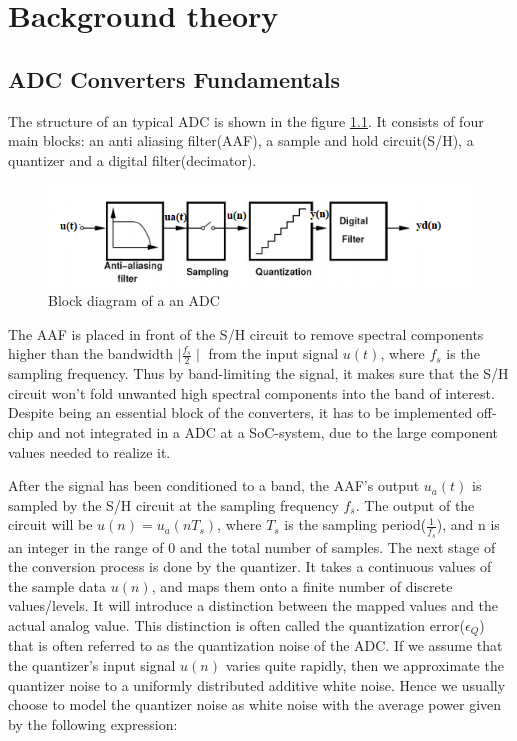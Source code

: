\chapter{Background theory}\label{Background_theory}

\section{ADC Converters Fundamentals }\label{fundamentals}

The structure of an typical ADC is shown in the figure \ref{fig:adc_block}. It consists of four main blocks: an anti aliasing filter(AAF), a sample and hold circuit(S/H), a quantizer and a digital filter(decimator).
\begin{figure}[h]
\centering
\includegraphics[scale=0.9]{images/adc_block.png}
\caption{Block diagram of a an ADC}
\label{fig:adc_block}
\end{figure}

The AAF is placed in front of the S/H circuit to remove spectral components higher than the bandwidth $\mid\frac{f_s}{2}\mid$ from the input signal $u(t)$, where $f_s$ is the sampling frequency. Thus by band-limiting the signal, it makes sure that the S/H circuit won't fold unwanted high spectral components into the band of interest. Despite being an essential block of the converters, it has to be implemented off-chip and not integrated in a ADC at a SoC-system, due to the large component values needed to realize it.  

After the signal has been conditioned to a band, the AAF's output $u_a(t)$ is sampled by the S/H circuit at the sampling frequency $f_s$. The output of the circuit will be $u(n) = u_a(nT_s)$, where $T_s$ is the sampling period($\frac{1}{f_s}$), and n is an integer in the range of 0 and the total number of samples. The next stage of the conversion process is done by the quantizer. It takes a continuous values of the sample data $u(n)$, and maps them onto a finite number of discrete values/levels. It will introduce a distinction between the mapped values and the actual analog value. This distinction is often called the quantization error($\epsilon_Q$) that is often referred to as the quantization noise of the ADC. If we assume that the quantizer's input signal $u(n)$ varies quite rapidly, then we approximate the quantizer noise to a uniformly distributed additive white noise. Hence we usually choose to model the quantizer noise as white noise with the average power given by the following expression: 

